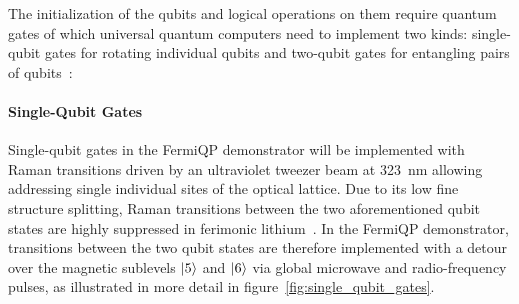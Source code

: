 The initialization of the qubits and logical operations on them require quantum gates of which universal quantum computers need to implement two kinds: single-qubit gates for rotating individual qubits and two-qubit gates for entangling pairs of qubits~\cite{nielsen_quantum_2010, hidary_quantum_2021, ladd_quantum_2010, mainzer_quantencomputer_2020}:

\paragraph*{Single-Qubit Gates}
Single-qubit gates in the FermiQP demonstrator will be implemented with Raman transitions driven by an ultraviolet tweezer beam at \SI[]{323}{\nano\meter} allowing addressing single individual sites of the optical lattice. Due to its low fine structure splitting, Raman transitions between the two aforementioned qubit states are highly suppressed in  ferimonic lithium~\cite{wei_magnetic-field_2013}. In the FermiQP demonstrator, transitions between the two qubit states are therefore implemented with a detour over the magnetic sublevels $\Ket{5}$ and $\Ket{6}$ via global microwave and radio-frequency pulses, as illustrated in more detail in figure~\ref{fig:single_qubit_gates}.

